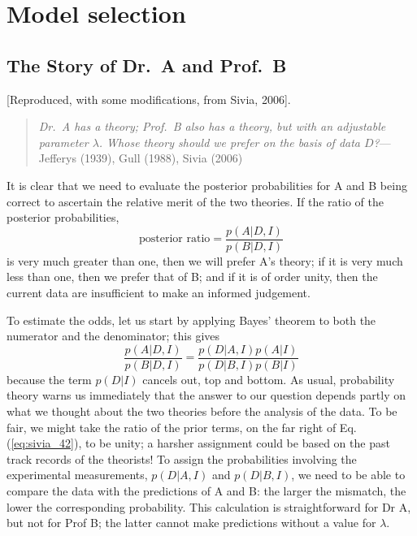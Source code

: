 \documentclass[%
oneside,                 %
final,                   %
10pt]{article}
\begin{document}
\section{Model selection}
\subsection{The Story of Dr.~A and Prof.~B}
[Reproduced, with some modifications, from Sivia, 2006].

\begin{quote}
\emph{Dr.~A has a theory; Prof.~B also has a theory, but with an adjustable parameter $\lambda$. Whose theory should we prefer on the basis of data $D$?}--- Jefferys (1939), Gull (1988), Sivia (2006)
\end{quote}

It is clear that we need to evaluate the posterior probabilities for A and B being correct to ascertain the relative merit of the two theories. If the ratio of the posterior probabilities,
\begin{equation}
\text{posterior ratio} = \frac{p(A |D, I )}{p(B|D,I)}
\label{eq:sivia_41}
\end{equation}
is very much greater than one, then we will prefer A’s theory; if it is very much less than one, then we prefer that of B; and if it is of order unity, then the current data are insufficient to make an informed judgement.

To estimate the odds, let us start by applying Bayes’ theorem to both the numerator and the denominator; this gives
\begin{equation}
\frac{p(A|D,I)}{p(B|D,I)} = \frac{p(D|A,I) p(A|I)}{p(D|B,I) p(B|I)}
\label{eq:sivia_42}
\end{equation}
because the term $p(D|I)$ cancels out, top and bottom. As usual, probability theory warns us immediately that the answer to our question depends partly on what we thought about the two theories before the analysis of the data. To be fair, we might take the ratio of the prior terms, on the far right of Eq. (\ref{eq:sivia_42}), to be unity; a harsher assignment could be based on the past track records of the theorists! To assign the probabilities involving the experimental measurements, $p(D|A,I)$ and $p(D|B,I)$, we need to be able to compare the data with the predictions of A and B: the larger the mismatch, the lower the corresponding probability. This calculation is straightforward for Dr A, but not for Prof B; the latter cannot make predictions without a value for $\lambda$.
\end{document}
